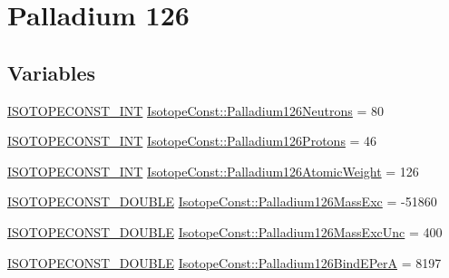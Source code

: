 \hypertarget{group___isotope_const-_palladium-_pd126}{}\section{Palladium 126}
\label{group___isotope_const-_palladium-_pd126}
\subsection*{Variables}
\begin{DoxyCompactItemize}
\item 
\mbox{\hyperlink{group___isotope_const-_macros_ga5f18360b3e99483a35c32d789e62621c}{I\+S\+O\+T\+O\+P\+E\+C\+O\+N\+S\+T\+\_\+\+I\+NT}} \mbox{\hyperlink{group___isotope_const-_palladium-_pd126_ga77ee7b7bf86374cd28c8ed1bb4c79c28}{Isotope\+Const\+::\+Palladium126\+Neutrons}} = 80
\item 
\mbox{\hyperlink{group___isotope_const-_macros_ga5f18360b3e99483a35c32d789e62621c}{I\+S\+O\+T\+O\+P\+E\+C\+O\+N\+S\+T\+\_\+\+I\+NT}} \mbox{\hyperlink{group___isotope_const-_palladium-_pd126_gac01e7c06ef579910fabc36b8b225b728}{Isotope\+Const\+::\+Palladium126\+Protons}} = 46
\item 
\mbox{\hyperlink{group___isotope_const-_macros_ga5f18360b3e99483a35c32d789e62621c}{I\+S\+O\+T\+O\+P\+E\+C\+O\+N\+S\+T\+\_\+\+I\+NT}} \mbox{\hyperlink{group___isotope_const-_palladium-_pd126_gac258cd32960a10910f1bc3c707bd92cd}{Isotope\+Const\+::\+Palladium126\+Atomic\+Weight}} = 126
\item 
\mbox{\hyperlink{group___isotope_const-_macros_ga8f45a7272ce02c0b4c65c44636ed719a}{I\+S\+O\+T\+O\+P\+E\+C\+O\+N\+S\+T\+\_\+\+D\+O\+U\+B\+LE}} \mbox{\hyperlink{group___isotope_const-_palladium-_pd126_gaa7372a80c018b0ea58cbe0d8d39bc891}{Isotope\+Const\+::\+Palladium126\+Mass\+Exc}} = -\/51860
\item 
\mbox{\hyperlink{group___isotope_const-_macros_ga8f45a7272ce02c0b4c65c44636ed719a}{I\+S\+O\+T\+O\+P\+E\+C\+O\+N\+S\+T\+\_\+\+D\+O\+U\+B\+LE}} \mbox{\hyperlink{group___isotope_const-_palladium-_pd126_gadf8f1621dd8d5362b408309a8fccf8c9}{Isotope\+Const\+::\+Palladium126\+Mass\+Exc\+Unc}} = 400
\item 
\mbox{\hyperlink{group___isotope_const-_macros_ga8f45a7272ce02c0b4c65c44636ed719a}{I\+S\+O\+T\+O\+P\+E\+C\+O\+N\+S\+T\+\_\+\+D\+O\+U\+B\+LE}} \mbox{\hyperlink{group___isotope_const-_palladium-_pd126_ga45dc2f7aecdfe85e549b7f56716e9914}{Isotope\+Const\+::\+Palladium126\+Bind\+E\+PerA}} = 8197
\item 

\end{DoxyCompactItemize}
